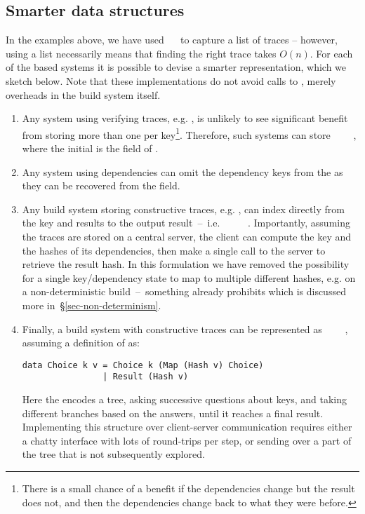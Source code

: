 \subsection{Smarter \hs{[Trace]} data structures}\label{sec-smart-traces}

In the examples above, we have used \hs{[Trace}~~\hs{v]} to capture a list of traces -- however, using a list necessarily means that finding the right trace takes $O(n)$. For each of the  based systems it is possible to devise a smarter representation, which we sketch below. Note that these implementations do not avoid calls to , merely overheads in the build system itself.

\begin{enumerate}
\item Any system using verifying traces, e.g. \Shake, is unlikely to see significant benefit from storing more than one  per key\footnote{There is a small chance of a benefit if the dependencies change but the result does not, and then the dependencies change back to what they were before.}. Therefore, such systems can store ~~~~, where the initial  is the  field of .
\item Any system using  dependencies can omit the dependency keys from the  as they can be recovered from the  field.
\item Any  build system storing constructive traces, e.g. \Bazel, can index directly from the key and results to the output result~--~i.e. ~~\hs{[Hash}~\hs{v])}~~. Importantly, assuming the traces are stored on a central server, the client can compute the key and the hashes of its dependencies, then make a single call to the server to retrieve the result hash. In this formulation we have removed the possibility for a single key/dependency state to map to multiple different hashes, e.g. on a non-deterministic build~--~something \Bazel already prohibits which is discussed more in~\S\ref{sec-non-determinism}.
\item Finally, a  build system with constructive traces can be represented as ~~~~, assuming a definition of  as:
\begin{verbatim}
data Choice k v = Choice k (Map (Hash v) Choice)
                | Result (Hash v)
\end{verbatim}
Here the  encodes a tree, asking successive questions about keys, and taking different branches based on the answers, until it reaches a final result. Implementing this structure over client-server communication requires either a chatty interface with lots of round-trips per  step, or sending over a part of the tree that is not subsequently explored.
\end{enumerate}
